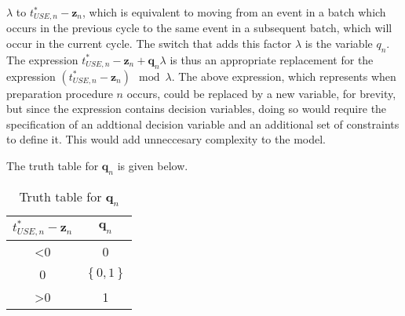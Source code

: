$\lambda$ to $t_{USE,n}^{*} - \boldsymbol{z}_{n}$, which is equivalent to
moving from an event in a batch which occurs in the previous cycle to the same
event in a subsequent batch, which will occur in the current cycle.
The switch that adds this factor $\lambda$ is the variable $q_{n}$.
The expression 
$t_{USE,n}^{*} - \boldsymbol{z}_{n} + \boldsymbol{q}_{n} \lambda$ is thus an
appropriate replacement for the expression
$\left( t_{USE,n}^{*} - \boldsymbol{z}_{n} \right) \mod \lambda$.
The above expression, which represents when preparation procedure $n$ occurs,
could be replaced by a new variable, for brevity, but since the expression
contains decision variables, doing so would require the specification of an
addtional decision variable and an additional set of constraints to define it.
This would add unneccesary complexity to the model.


The truth table for $ \boldsymbol{q}_{n} $ is given below.
\begin{table}[h!]
    \centering
    \caption{Truth table for $\boldsymbol{q}_{n}$}
    \label{tbl.truthq}
    \begin{tabular}{c | c}
        $t_{USE,n}^{*} - \boldsymbol{z}_{n}$
        & $\boldsymbol{q}_{n}$\\ \hline
        <0 & 0\\
        0 & $\left\{ 0, 1 \right\}$\\
        >0 & 1\\
    \end{tabular}
\end{table}

